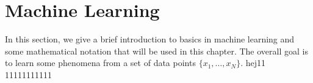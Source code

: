 \section{Machine Learning} 
\label{sec:machine_learning}

In this section, we give a brief introduction to basics in machine learning and some mathematical notation that will be used in this chapter. The overall goal is to learn some phenomena from a set of data points $\{x_1, \dots, x_N\}$. hej11 11111111111